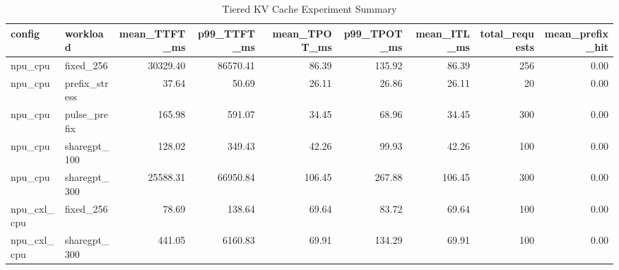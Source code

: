 \begin{table}
\caption{Tiered KV Cache Experiment Summary}
\label{tab:tiered_kv_summary}
\begin{tabular}{llrrrrrrr}
\toprule
config & workload & mean_TTFT_ms & p99_TTFT_ms & mean_TPOT_ms & p99_TPOT_ms & mean_ITL_ms & total_requests & mean_prefix_hit \\
\midrule
npu_cpu & fixed_256 & 30329.40 & 86570.41 & 86.39 & 135.92 & 86.39 & 256 & 0.00 \\
npu_cpu & prefix_stress & 37.64 & 50.69 & 26.11 & 26.86 & 26.11 & 20 & 0.00 \\
npu_cpu & pulse_prefix & 165.98 & 591.07 & 34.45 & 68.96 & 34.45 & 300 & 0.00 \\
npu_cpu & sharegpt_100 & 128.02 & 349.43 & 42.26 & 99.93 & 42.26 & 100 & 0.00 \\
npu_cpu & sharegpt_300 & 25588.31 & 66950.84 & 106.45 & 267.88 & 106.45 & 300 & 0.00 \\
npu_cxl_cpu & fixed_256 & 78.69 & 138.64 & 69.64 & 83.72 & 69.64 & 100 & 0.00 \\
npu_cxl_cpu & sharegpt_300 & 441.05 & 6160.83 & 69.91 & 134.29 & 69.91 & 100 & 0.00 \\
\bottomrule
\end{tabular}
\end{table}
